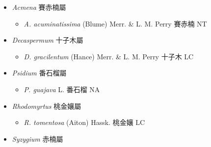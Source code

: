 
  \begin{itemize}
 \item[] \textit{Acmena} 賽赤楠屬
                                
  \begin{itemize}
        \item[] \textit{A. acuminatissima} (Blume) Merr. \& L. M. Perry  賽赤楠   NT
  \end{itemize}
 \item[] \textit{Decaspermum} 十子木屬
                                
  \begin{itemize}
        \item[] \textit{D. gracilentum} (Hance) Merr. \& L. M. Perry  十子木   LC
  \end{itemize}
 \item[] \textit{Psidium} 番石榴屬
                                
  \begin{itemize}
        \item[] \textit{P. guajava} L.  番石榴   NA
  \end{itemize}
 \item[] \textit{Rhodomyrtus} 桃金孃屬
                                
  \begin{itemize}
        \item[] \textit{R. tomentosa} (Aiton) Hassk.  桃金孃   LC
  \end{itemize}
 \item[] \textit{Syzygium} 赤楠屬
                                

\end{itemize}
